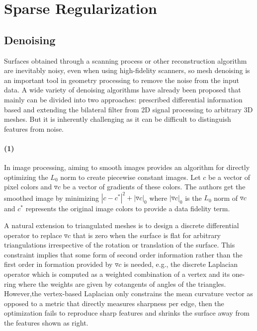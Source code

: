 \section{Sparse Regularization}
\label{sec:Sparse Regularization}

\subsection{Denoising}
\label{subsec:L0 denoising}

Surfaces obtained through a scanning process or other reconstruction algorithm are inevitably noisy, even when using high-fidelity scanners,
so mesh denoising is an important tool in geometry processing to remove the noise from the input data.
A wide variety of denoising algorithms have already been proposed that mainly can be divided into two approaches:
prescribed differential information based and extending the bilateral filter from 2D signal processing to arbitrary 3D meshes.
But it is inherently challenging as it can be difficult to distinguish features from noise.

\paragraph{(1)}
In image processing, \cite{xu2011image} aiming to smooth images provides an algorithm for directly optimizing the $L_0$ norm to create piecewise constant images.
Let $c$ be a vector of pixel colors and $\triangledown c$ be a vector of gradients of these colors.
The authors get the smoothed image by minimizing $|c-c^{*}|^2+|\triangledown c|_0$ where $|\triangledown c|_0$ is the $L_0$ norm of $\triangledown c$
and $c^{*}$ represents the original image colors to provide a data fidelity term.

A natural extension to triangulated meshes is to design a discrete differential operator to replace $\triangledown c$ that is zero when the surface is flat for arbitrary triangulations irrespective of the rotation or translation of the surface.
This constraint implies that some form of second order information rather than the first order in formation provided by $\triangledown c$ is needed, e.g.,  the discrete Laplacian operator\cite{pinkall1993computing} which is computed as a weighted combination of a vertex and its one-ring where the weights are given by cotangents of angles of the triangles.
However,the vertex-based Laplacian only constrains the mean curvature vector as opposed to a metric that directly measures sharpness per edge, then the optimization fails to reproduce sharp features and shrinks the surface away from the features shown as right.

